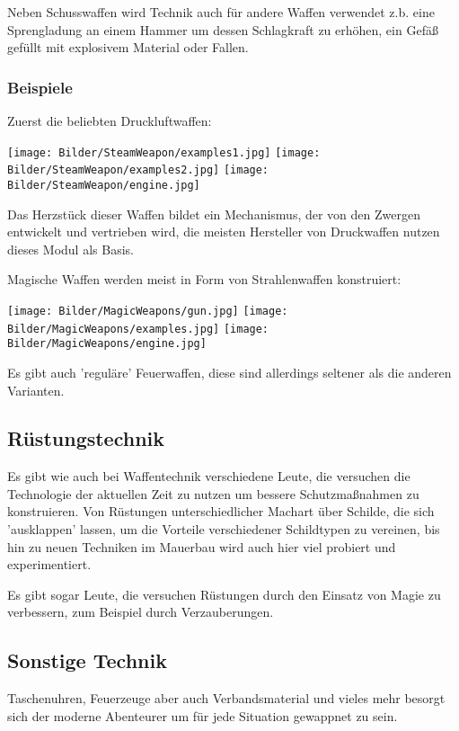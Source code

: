 Neben Schusswaffen wird Technik auch für andere Waffen verwendet z.b. eine Sprengladung an einem Hammer um dessen Schlagkraft zu erhöhen, ein Gefäß gefüllt mit explosivem Material oder Fallen.

\begin{Images}
\subsubsection{Beispiele}
Zuerst die beliebten Druckluftwaffen:

\texttt{[image: Bilder/SteamWeapon/examples1.jpg]}\nolinebreak
\texttt{[image: Bilder/SteamWeapon/examples2.jpg]}\nolinebreak
\texttt{[image: Bilder/SteamWeapon/engine.jpg]}

Das Herzstück dieser Waffen bildet ein Mechanismus, der von den Zwergen entwickelt und vertrieben wird, die meisten Hersteller von Druckwaffen nutzen dieses Modul als Basis.


Magische Waffen werden meist in Form von Strahlenwaffen konstruiert:

\texttt{[image: Bilder/MagicWeapons/gun.jpg]}\nolinebreak
\texttt{[image: Bilder/MagicWeapons/examples.jpg]}\nolinebreak
\texttt{[image: Bilder/MagicWeapons/engine.jpg]}

Es gibt auch 'reguläre' Feuerwaffen, diese sind allerdings seltener als die anderen Varianten.
\end{Images}

\subsection{Rüstungstechnik}

Es gibt wie auch bei Waffentechnik verschiedene Leute, die versuchen die Technologie der aktuellen Zeit zu nutzen um bessere Schutzmaßnahmen zu konstruieren. Von Rüstungen unterschiedlicher Machart über Schilde, die sich 'ausklappen' lassen, um die Vorteile verschiedener Schildtypen zu vereinen, bis hin zu neuen Techniken im Mauerbau wird auch hier viel probiert und experimentiert.

Es gibt sogar Leute, die versuchen Rüstungen durch den Einsatz von Magie zu verbessern, zum Beispiel durch Verzauberungen.

\subsection{Sonstige Technik}
Taschenuhren, Feuerzeuge aber auch Verbandsmaterial und vieles mehr besorgt sich der moderne Abenteurer um für jede Situation gewappnet zu sein.